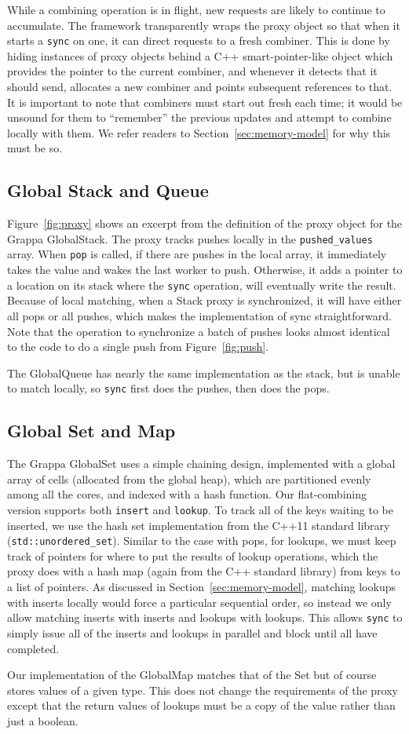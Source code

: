 While a combining operation is in flight, new requests are likely to continue to accumulate. The framework transparently wraps the proxy object so that when it starts a \texttt{sync} on one, it can direct requests to a fresh combiner.
This is done by hiding instances of proxy objects behind a C++ smart-pointer-like object which provides the pointer to the current combiner, and whenever it detects that it should send, allocates a new combiner and points subsequent references to that.
It is important to note that combiners must start out fresh each time; it would be unsound for them to ``remember'' the previous updates and attempt to combine locally with them. We refer readers to Section~\ref{sec:memory-model} for why this must be so.

\subsection{Global Stack and Queue}
Figure~\ref{fig:proxy} shows an excerpt from the definition of the proxy object for the Grappa GlobalStack. The proxy tracks pushes locally in the \texttt{pushed\_values} array. When \texttt{pop} is called, if there are pushes in the local array, it immediately takes the value and wakes the last worker to push. Otherwise, it adds a pointer to a location on its stack where the \texttt{sync} operation, will eventually write the result. Because of local matching, when a Stack proxy is synchronized, it will have either all pops or all pushes, which makes the implementation of sync straightforward. Note that the operation to synchronize a batch of pushes looks almost identical to the code to do a single push from Figure~\ref{fig:push}.

The GlobalQueue has nearly the same implementation as the stack, but is unable to match locally, so \texttt{sync} first does the pushes, then does the pops.

\subsection{Global Set and Map}
The Grappa GlobalSet uses a simple chaining design, implemented with a global array of cells (allocated from the global heap), which are partitioned evenly among all the cores, and indexed with a hash function. Our flat-combining version supports both \texttt{insert} and \texttt{lookup}. To track all of the keys waiting to be inserted, we use the hash set implementation from the C++11 standard library (\texttt{std::unordered\_set}). Similar to the case with pops, for lookups, we must keep track of pointers for where to put the results of lookup operations, which the proxy does with a hash map (again from the C++ standard library) from keys to a list of pointers. As discussed in Section~\ref{sec:memory-model}, matching lookups with inserts locally would force a particular sequential order, so instead we only allow matching inserts with inserts and lookups with lookups. This allows \texttt{sync} to simply issue all of the inserts and lookups in parallel and block until all have completed.

Our implementation of the GlobalMap matches that of the Set but of course stores values of a given type. This does not change the requirements of the proxy except that the return values of lookups must be a copy of the value rather than just a boolean.

